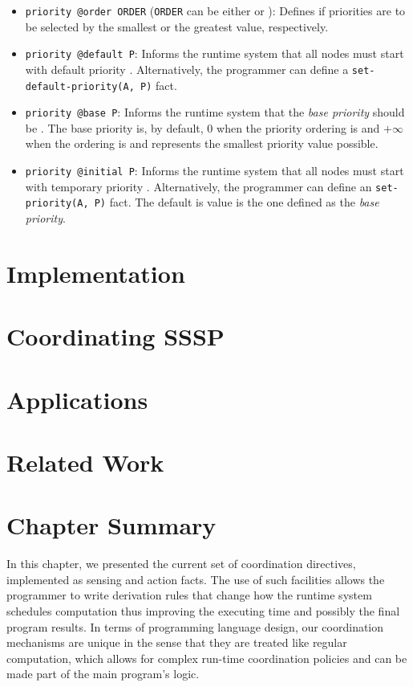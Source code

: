 \begin{itemize}

   \item \texttt{priority @order ORDER} (\texttt{ORDER} can be either 
      or ): Defines if priorities are to be selected by the smallest
      or the greatest value, respectively.

   \item \texttt{priority @default P}: Informs the runtime system that all nodes
      must start with default priority . Alternatively, the programmer can define a
      \texttt{set-default-priority(A, P)} fact.

   \item \texttt{priority @base P}: Informs the runtime system that the
      \emph{base priority} should be . The base priority is, by default,
      0 when the priority ordering is  and $+\infty$ when the ordering
      is  and represents the smallest priority value possible.

   \item \texttt{priority @initial P}: Informs the runtime system that all nodes
   must start with temporary priority . Alternatively, the programmer can define an
      \texttt{set-priority(A, P)} fact. The default is value is the one defined
      as the \emph{base priority}.

\end{itemize}

\section{Implementation}


\section{Coordinating SSSP}


\section{Applications}



\section{Related Work}\label{sec:coordination:related}

\section{Chapter Summary}

In this chapter, we presented the current set of coordination directives,
implemented as sensing and action facts. The use of such facilities allows the
programmer to write derivation rules that change how the runtime system
schedules computation thus improving the executing time and possibly the final
program results. In terms of programming language design, our coordination
mechanisms are unique in the sense that they are treated like regular
computation, which allows for complex run-time coordination policies and can be
made part of the main program's logic.

